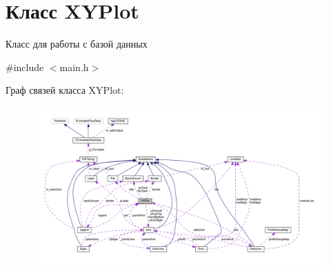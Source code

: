 \hypertarget{class_x_y_plot}{\section{Класс X\-Y\-Plot}
\label{class_x_y_plot}
}


Класс для работы с базой данных  




{\ttfamily \#include $<$main.\-h$>$}



Граф связей класса X\-Y\-Plot\-:
\nopagebreak
\begin{figure}[H]
\begin{center}
\leavevmode
\includegraphics[width=350pt]{class_x_y_plot__coll__graph}
\end{center}
\end{figure}

